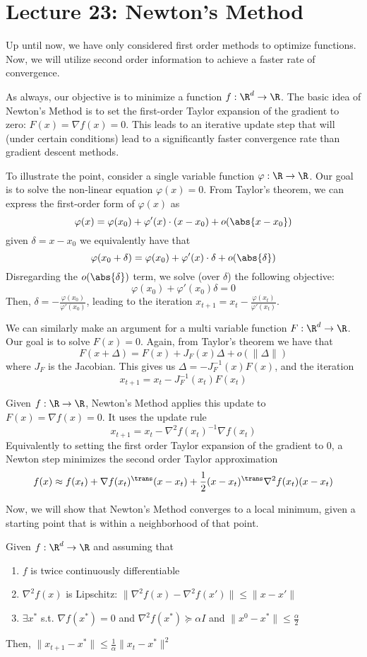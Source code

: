 \section{Lecture 23: Newton's Method}
Up until now, we have only considered first order  methods to optimize functions. Now, we will utilize second order information to achieve a faster rate of convergence.

As always, our objective is to minimize a function $f : \R^d \rightarrow \R$. The basic idea of Newton's Method is to set the first-order Taylor expansion of the gradient to zero: $F(x) = \nabla f(x) = 0$. This leads to an iterative update step that will (under certain conditions) lead to a significantly faster convergence rate than gradient descent methods.

To illustrate the point, consider a single variable function $\varphi:\R \rightarrow \R$. Our goal is to solve the non-linear equation $\varphi(x) = 0$. From Taylor's theorem, we can express the first-order form of $\varphi(x)$ as
$$\varphi(x) = \varphi(x_0) + \varphi'(x) \cdot (x-x_0) + o(\abs{x-x_0})$$
given $\delta = x - x_0$ we equivalently have that
$$\varphi(x_0 + \delta) = \varphi(x_0) + \varphi'(x) \cdot \delta + o(\abs{\delta})$$
Disregarding the $o(\abs{\delta})$ term, we solve (over $\delta$) the following objective: $$\varphi(x_0) + \varphi'(x_0) \delta = 0$$
Then, $\delta = -\frac{\varphi(x_0)}{\varphi'(x_0)}$, leading to the iteration 
$x_{t+1} = x_t - \frac{\varphi(x_t)}{\varphi'(x_t)}$.

We can similarly make an argument for a multi variable function $F: \R^d \rightarrow \R$. Our goal is to solve $F(x) = 0$. Again, from Taylor's theorem we have that
$$F(x + \Delta) = F(x) +  J_F(x) \Delta + o(\| \Delta\|)$$
where $J_F$ is the Jacobian. This gives us
$\Delta = -J_F^{-1}(x)F(x)$, and the iteration
$$x_{t+1} = x_t - J_F^{-1}(x_t)F(x_t)$$

Given $f : \R \rightarrow \R$, Newton's Method applies this update to $F(x) = \nabla f(x) = 0$. It uses the update rule
$$x_{t+1} = x_t - \nabla^2 f(x_t)^{-1} \nabla f(x_t)$$
Equivalently to setting the first order Taylor expansion of the gradient to 0, a Newton step minimizes the second order Taylor approximation
$$f(x) \approx f(x_t) + \nabla f(x_t) ^\trans (x - x_t) + \frac{1}{2} (x - x_t) ^\trans \nabla^2 f(x_t) (x - x_t)$$

Now, we will show that Newton's Method converges to a local minimum, given a starting point that is within a neighborhood of that point.
\begin{theorem}
Given $f: \R^d \rightarrow \R$ and assuming that
\begin{enumerate}
\item $f$ is twice continuously differentiable
\item $\nabla^2 f(x)$ is Lipschitz: $\| \nabla^2 f(x) - \nabla^2 f(x') \| \leq \|x-x'\|$
\item $\exists x^*$ s.t. $\nabla f(x^*) = 0$ and $\nabla^2 f(x^*) \succeq \alpha I$ and $\|x^0 - x^*\| \leq \frac{\alpha}{2}$
\end{enumerate}
Then, $\|x_{t+1} - x^*\| \leq \frac{1}{\alpha} \|x_t - x^*\|^2$
\end{theorem}

